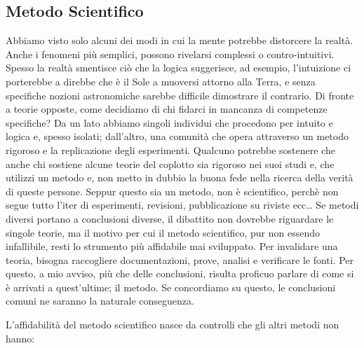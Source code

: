 \documentclass[12pt]{book} %
\begin{document}
\subsection{Metodo Scientifico}
Abbiamo visto solo alcuni dei modi in cui la mente potrebbe distorcere la realtà.
Anche i fenomeni più semplici, possono rivelarsi complessi o contro-intuitivi. Spesso la realtà smentisce ciò che la logica suggerisce, ad esempio, l'intuizione ci porterebbe a direbbe che è il Sole a muoversi attorno alla Terra, e senza specifiche nozioni astronomiche sarebbe difficile dimostrare il contrario.
Di fronte a teorie opposte, come decidiamo di chi fidarci in mancanza di competenze specifiche? Da un lato abbiamo singoli individui che procedono per intuito e logica e, spesso isolati; dall'altro, una comunità che opera attraverso un metodo rigoroso e la replicazione degli esperimenti.
Qualcuno potrebbe sostenere che anche chi sostiene alcune teorie del coplotto sia rigoroso nei suoi studi e, che utilizzi un metodo e, non metto in dubbio la buona fede nella ricerca della verità di queste persone. Seppur questo sia un metodo, non è scientifico, perchè non segue tutto l'iter di esperimenti, revisioni, pubblicazione su riviste ecc…
Se metodi diversi portano a conclusioni diverse, il dibattito non dovrebbe riguardare le singole teorie, ma il motivo per cui il metodo scientifico, pur non essendo infallibile, resti lo strumento più affidabile mai sviluppato. 
Per invalidare una teoria, bisogna raccogliere documentazioni, prove, analisi e verificare le fonti. Per questo, a mio avviso, più che delle conclusioni, risulta proficuo parlare di come si è arrivati a quest'ultime; il metodo. Se concordiamo su questo, le conclusioni comuni ne saranno la naturale conseguenza.

L'affidabilità del metodo scientifico nasce da controlli che gli altri metodi non hanno:
\end{document}
